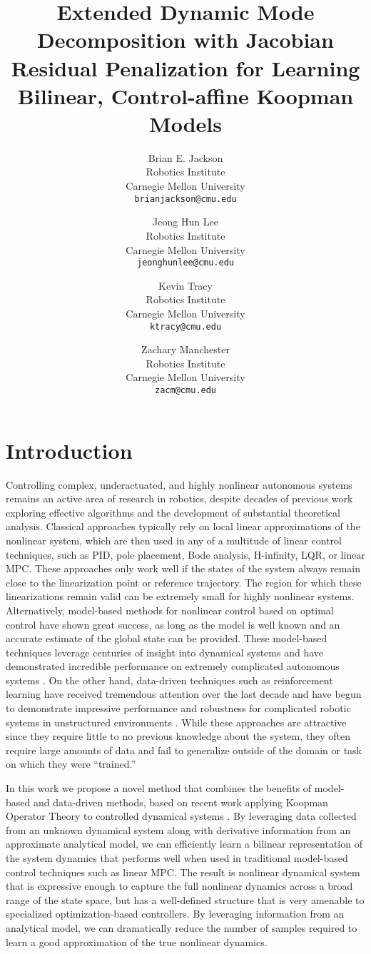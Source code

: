 \documentclass{article}
\title{Extended Dynamic Mode Decomposition with Jacobian Residual Penalization
for Learning Bilinear, Control-affine Koopman Models}
\author{
  Brian E. Jackson \\
  Robotics Institute \\
  Carnegie Mellon University\\
  \texttt{brianjackson@cmu.edu} \\
  \and
  Jeong Hun Lee \\
  Robotics Institute\\
  Carnegie Mellon University\\
  \texttt{jeonghunlee@cmu.edu} \\
  \and
  Kevin Tracy \\
  Robotics Institute\\
  Carnegie Mellon University\\
  \texttt{ktracy@cmu.edu} \\
  \and
  Zachary Manchester \\
  Robotics Institute\\
  Carnegie Mellon University\\
  \texttt{zacm@cmu.edu} \\
}
\begin{document}
\maketitle

\section{Introduction}

    Controlling complex, underactuated, and highly nonlinear autonomous systems remains an
    active area of research in robotics, despite decades of previous work exploring
    effective algorithms and the development of substantial theoretical analysis. Classical
    approaches typically rely on local linear approximations of the nonlinear system, which
    are then used in any of a multitude of linear control techniques, such as PID, pole
    placement, Bode analysis, H-infinity, LQR, or linear MPC.  These approaches only work
    well if the states of the system always remain close to the linearization point or
    reference trajectory. The region for which these linearizations remain valid can be
    extremely small for highly nonlinear systems.  Alternatively, model-based methods for
    nonlinear control based on optimal control have shown great success, as long as the
    model is well known and an accurate estimate of the global state can be provided. These
    model-based techniques leverage centuries of insight into dynamical systems and have
    demonstrated incredible performance on extremely complicated autonomous systems 
    .  On the other hand, data-driven techniques
    such as reinforcement learning have received tremendous attention over the last decade
    and have begun to demonstrate impressive performance and robustness for complicated
    robotic systems in unstructured environments . While these approaches are attractive since they require
    little to no previous knowledge about the system, they often require large amounts of
    data and fail to generalize outside of the domain or task on which they were
    ``trained.''
    
    In this work we propose a novel method that combines the benefits of model-based and
    data-driven methods, based on recent work  applying Koopman Operator Theory to
    controlled dynamical systems .  By leveraging data collected from an unknown dynamical system along with
    derivative information from an approximate analytical model, we can efficiently learn a
    bilinear representation of the system dynamics that performs well when used in
    traditional model-based control techniques such as linear MPC. The result is nonlinear
    dynamical system that is expressive enough to capture the full nonlinear dynamics across
    a broad range of the state space, but has a well-defined structure that is very amenable
    to specialized optimization-based controllers. By leveraging information from an
    analytical model, we can dramatically reduce the number of samples required to learn a
    good approximation of the true nonlinear dynamics. 
    
\end{document}
